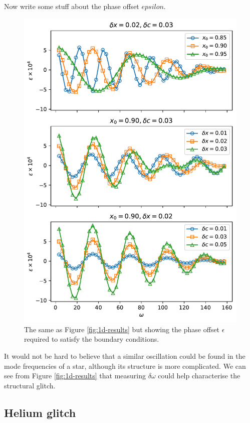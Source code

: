 Now write some stuff about the phase offset \(epsilon\).

\begin{figure}
    \centering
    \includegraphics{figures/glitch-1d-example-phase.pdf}
    \caption{The same as Figure \ref{fig:1d-results} but showing the phase offset \(\epsilon\) required to satisfy the boundary conditions.}
    \label{fig:1d-phase}
\end{figure}


It would not be hard to believe that a similar oscillation could be found in the mode frequencies of a star, although its structure is more complicated. We can see from Figure \ref{fig:1d-results} that measuring \(\delta\omega\) could help characterise the structural glitch.

\subsection{Helium glitch}\label{sec:helium-glitch}

